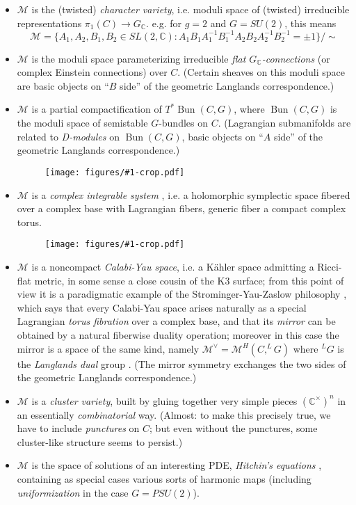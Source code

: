 \documentclass[12pt,letterpaper,reqno]{article}
\numberwithin{equation}{section}
\newcommand{\cM}{\ensuremath{\mathcal M}}
\newcommand{\C}{\ensuremath{\mathbb C}}
\newcommand{\kahler}{K\"ahler\xspace}
\newcommand{\ti}[1]{\textit{#1}}
\DeclareMathOperator{\Bun}{Bun}
\newcommand{\insfig}[2]{\begin{figure}[htbp] \centering \texttt{[image: figures/\#1-crop.pdf]} \label{fig:#1} \end{figure}}
\begin{document}
\begin{itemize}
\item $\cM$ is the (twisted) \ti{character variety}, i.e. moduli space of
(twisted) irreducible representations
$\pi_1(C) \to G_\C$.
e.g. for $g=2$ and $G = SU(2)$, 
this means
\begin{equation}
  \cM = \{ A_1,A_2,B_1,B_2 \in SL(2,\C): A_1 B_1 A_1^{-1} B_1^{-1} A_2 B_2 A_2^{-1} B_2^{-1} = \pm 1 \} / \sim
\end{equation}
\item $\cM$ is the moduli space parameterizing irreducible
\ti{flat $G_\C$-connections} (or complex Einstein connections)
over $C$. (Certain sheaves on this moduli space are 
basic objects on ``$B$ side'' of the geometric Langlands correspondence.)
\item $\cM$ is a partial compactification of $T^* \Bun(C,G)$, where $\Bun(C,G)$ is the moduli space of semistable $G$-bundles on $C$. (Lagrangian submanifolds are related to \ti{D-modules} on $\Bun(C,G)$, basic objects on ``$A$ side'' 
of the geometric Langlands correspondence.)
\insfig{higgs-bundles-2}{0.55}
\item $\cM$ is a \ti{complex integrable system} \cite{MR88i:58068}, i.e. a holomorphic
symplectic space fibered over a complex base with Lagrangian
fibers, generic fiber a compact complex torus. \insfig{higgs-bundles-1}{0.8}
\item $\cM$ is a noncompact \ti{Calabi-Yau space}, i.e. a \kahler
space admitting a Ricci-flat metric, in some sense a close 
cousin of the K3 surface; from this point of view
it is a paradigmatic example of the Strominger-Yau-Zaslow
philosophy \cite{Strominger:1996it}, 
which says that every Calabi-Yau space arises naturally
as a special Lagrangian \ti{torus fibration} over a complex base,
and that its \ti{mirror} can be obtained by a natural fiberwise duality
operation; moreover in this case the mirror is a space of the same kind,
namely $\cM^\vee = \cM^H(C,^L G)$ where 
$^L G$ is the \ti{Langlands dual} group \cite{mlh,MR2957305}.
(The mirror symmetry
exchanges the two sides of the geometric Langlands correspondence.)
\item $\cM$ is a \ti{cluster variety}, built by gluing together
very simple pieces $(\C^\times)^n$ in an essentially \ti{combinatorial} way. (Almost: to make this precisely true, we have to include \ti{punctures} on $C$; but even without the punctures, some cluster-like
structure seems to persist.)
\item $\cM$ is the space of solutions of an interesting PDE, \ti{Hitchin's equations} \cite{MR89a:32021}, containing as special cases various sorts of harmonic maps (including \ti{uniformization} in the case $G = PSU(2)$).
\end{itemize}
\end{document}
